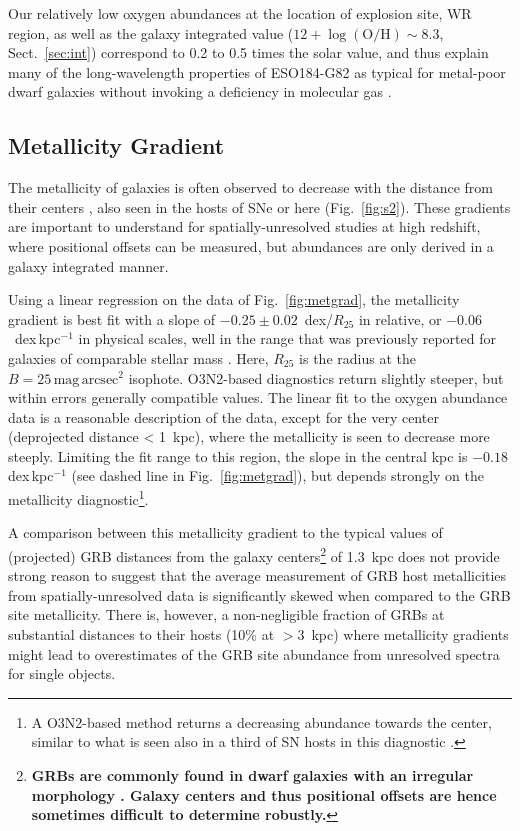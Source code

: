 \documentclass[traditabstract, referee]{aa}
\newcommand{\oh}{12+\log(\mathrm{O/H})}
\begin{document}
Our relatively low oxygen abundances at the location of explosion site, WR region, as well as the galaxy integrated value ($\oh\sim8.3$, Sect.~\ref{sec:int}) correspond to 0.2 to 0.5 times the solar value, and thus explain many of the long-wavelength properties of ESO184-G82 as typical for metal-poor dwarf galaxies without invoking a deficiency in molecular gas \citep{2016arXiv160901742M}.

\subsection{Metallicity Gradient}
\label{sec:metgrad}

The metallicity of galaxies is often observed to decrease with the distance from their centers \citep[e.g.][]{1994ApJ...420...87Z, 2014A&A...563A..49S}, also seen in the hosts of SNe \citep{2016A&A...591A..48G} or here (Fig.~\ref{fig:s2}). These gradients are important to understand for spatially-unresolved studies at high redshift, where positional offsets can be measured, but abundances are only derived in a galaxy integrated manner. 

Using a linear regression on the data of Fig.~\ref{fig:metgrad}, the metallicity gradient is best fit with a slope of $-0.25\pm0.02$~dex/$R_{25}$ in relative, or $-0.06$~dex\,kpc$^{-1}$ in physical scales, well in the range that was previously reported for galaxies of comparable stellar mass \citep{2015MNRAS.448.2030H}. Here, $R_{25}$ is the radius at the $B=25\,\mathrm{mag}\,\mathrm{arcsec}^2$ isophote. O3N2-based diagnostics return slightly steeper, but within errors generally compatible values. The linear fit to the oxygen abundance data is a reasonable description of the data, except for the very center (deprojected distance < 1~kpc), where the metallicity is seen to decrease more steeply. Limiting the fit range to this region, the slope in the central kpc is $-0.18$\,dex\,kpc$^{-1}$ (see dashed line in Fig.~\ref{fig:metgrad}), but depends strongly on the metallicity diagnostic\footnote{A O3N2-based method returns a decreasing abundance towards the center, similar to what is seen also in a third of SN hosts in this diagnostic \citep{2016A&A...591A..48G}.}.

A comparison between this metallicity gradient to the typical values of (projected) GRB distances from the galaxy centers\footnote{\textbf{GRBs are commonly found in dwarf galaxies with an irregular morphology \citep[e.g.,][]{2006Natur.441..463F, 2017MNRAS.tmp..220L}. Galaxy centers and thus positional offsets are hence sometimes difficult to determine robustly.}} of 1.3~kpc \citep{2016ApJ...817..144B} does not provide strong reason to suggest that the average measurement of GRB host metallicities from spatially-unresolved data is significantly skewed when compared to the GRB site metallicity. There is, however, a non-negligible fraction of GRBs at substantial distances to their hosts (10\% at $>3$~kpc) where metallicity gradients might lead to overestimates of the GRB site abundance from unresolved spectra for single objects.
\end{document}
